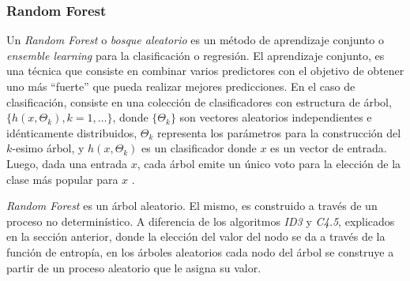 \subsubsection{Random Forest}
\label{subsubsection:random_forest}

	

	Un \textit{Random Forest} o \textit{bosque aleatorio} es un método de aprendizaje conjunto o \textit{ ensemble learning} para la clasificación o regresión. El aprendizaje conjunto, es una técnica que consiste en combinar varios predictores con el objetivo de obtener uno más ``fuerte'' que pueda realizar mejores predicciones. En el caso de clasificación, consiste en una colección de clasificadores con estructura de árbol, $\{h(x,\Theta_k), k = 1,\dots\}$, donde $\{\Theta_k\}$ son vectores aleatorios independientes e idénticamente distribuidos, $\Theta_k$ representa los parámetros para la construcción del $k$-esimo árbol, y $h(x,\Theta_k)$ es un clasificador donde $x$ es un vector de entrada. Luego, dada una entrada $x$, cada árbol emite un único voto para la elección de la clase más popular para $x$ \cite{Breiman01}.

	\textit{Random Forest} es un árbol aleatorio. El mismo, es construido a través de un proceso no determinístico. A diferencia de los algoritmos \textit{ID3} y \textit{C4.5}, explicados en la sección anterior, donde la elección del valor del nodo se da a través de la función de entropía, en los árboles aleatorios cada nodo del árbol se construye a partir de un proceso aleatorio que le asigna su valor.

